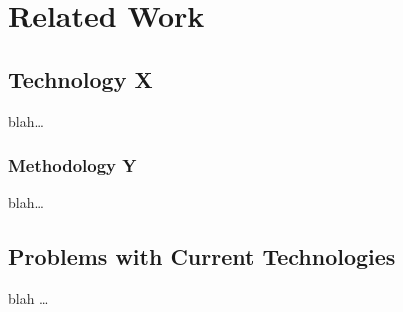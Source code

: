 \chapter{Related Work}


\section{Technology X}
blah\dots

\subsection{Methodology Y}
blah\dots


\section{Problems with Current Technologies}
blah \dots





